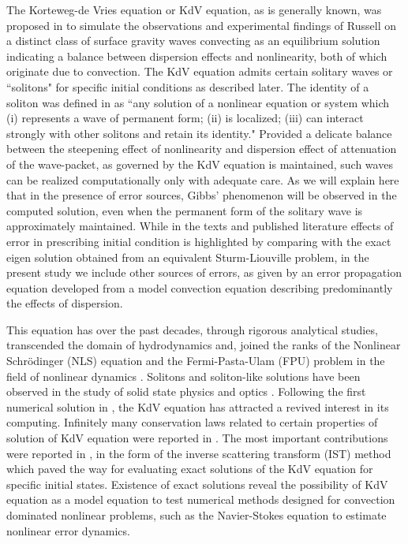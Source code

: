 \documentclass{svjour3}                    %
\begin{document}
The Korteweg-de Vries equation or KdV equation, as is generally known, was proposed in \cite{Informa} to simulate the observations and experimental findings of Russell \cite{Russell1844} on a distinct class of surface gravity waves convecting as an equilibrium solution indicating a balance between dispersion effects and nonlinearity, both of which originate due to convection. The KdV equation admits certain solitary waves or ``solitons" for specific initial conditions as described later. The identity of a soliton was defined in \cite{Drazin1989} as ``any solution of a nonlinear equation or system which (i) represents a wave of permanent form; (ii) is localized; (iii) can interact strongly with other solitons and retain its identity." Provided a delicate balance between the steepening effect of nonlinearity and dispersion effect of attenuation of the wave-packet, as governed by the KdV equation is maintained, such waves can be realized computationally only with adequate care. As we will explain here that in the presence of error sources, Gibbs' phenomenon will be observed in the computed solution, even when the permanent form of the solitary wave is approximately maintained. While in the texts \cite{Drazin1989}
and published literature \cite{Fornberg1978} effects of error in prescribing initial condition is highlighted by comparing with the exact eigen solution obtained from an equivalent Sturm-Liouville problem, in the present study we include other sources of errors, as given by an error propagation equation developed from a model convection equation describing predominantly the effects of dispersion. 

This equation has over the past decades, through rigorous analytical studies, transcended the domain of hydrodynamics and, joined the ranks of the Nonlinear Schr\"odinger (NLS) equation and the Fermi-Pasta-Ulam (FPU) problem in the field of nonlinear dynamics \cite{Zabusky2005a}. Solitons and 
soliton-like solutions have been observed in the study of solid state physics \cite{Seeger1953} and optics \cite{Hasegawa1973}. Following the first numerical solution in \cite{Zabusky1965}, the KdV equation has attracted a revived interest in its computing. Infinitely many conservation laws related 
to certain properties of solution of KdV equation were reported in \cite{Miura1968,Whitham1965}. The most important contributions were reported in 
\cite{Gardner1967,Lax1968}, in the form of the inverse scattering transform (IST) method which paved the way for evaluating exact solutions of the KdV equation for specific initial states. Existence of exact solutions reveal the possibility of KdV equation as a model equation to test numerical methods designed for convection dominated nonlinear problems, such as the Navier-Stokes equation to estimate nonlinear error dynamics. 
\end{document}
